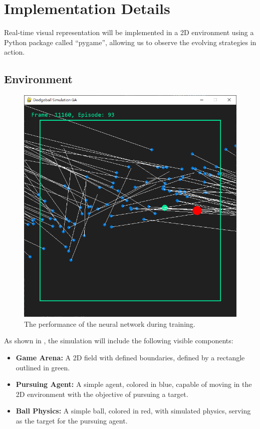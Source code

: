 \documentclass[sigconf]{acmart}
\begin{document}
\section{Implementation Details}
Real-time visual representation will be implemented in a 2D environment using a Python package called ``pygame'', allowing us to observe the evolving strategies in action. 
\subsection{Environment}
\begin{figure}[H]
  \centering
  \includegraphics[width=0.9\linewidth]{demo01.png}
  \caption{The performance of the neural network during training.}
  \label{fig:ball_demo}
\end{figure}
As shown in , the simulation will include the following visible components:
\begin{itemize}
  \item \textbf{Game Arena:} A 2D field with defined boundaries, defined by a rectangle outlined in green.
  \item \textbf{Pursuing Agent:} A simple agent, colored in blue, capable of moving in the 2D environment with the objective of pursuing a target.
  \item \textbf{Ball Physics:} A simple ball, colored in red, with simulated physics, serving as the target for the pursuing agent.
\end{itemize}
\end{document}
